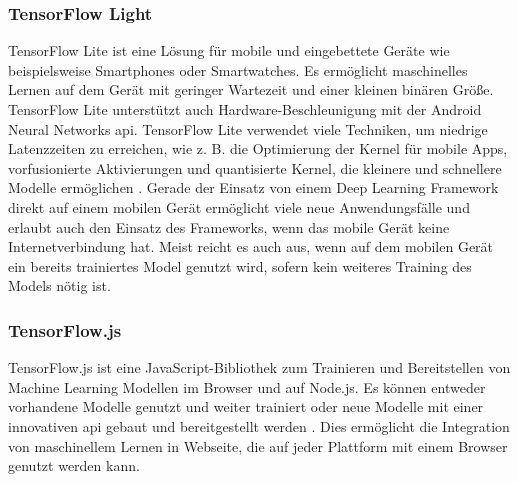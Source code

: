 \subsubsection{TensorFlow Light}
TensorFlow Lite ist eine Lösung für mobile und eingebettete Geräte wie beispielsweise Smartphones oder Smartwatches. Es ermöglicht maschinelles Lernen auf dem Gerät mit geringer Wartezeit und einer kleinen binären Größe. TensorFlow Lite unterstützt auch Hardware-Beschleunigung mit der Android Neural Networks \ac{api}. TensorFlow Lite verwendet viele Techniken, um niedrige Latenzzeiten zu erreichen, wie z. B. die Optimierung der Kernel für mobile Apps, vorfusionierte Aktivierungen und quantisierte Kernel, die kleinere und schnellere Modelle ermöglichen \cite{tensorflow}. Gerade der Einsatz von einem Deep Learning Framework direkt auf einem mobilen Gerät ermöglicht viele neue Anwendungsfälle und erlaubt auch den Einsatz des Frameworks, wenn das mobile Gerät keine Internetverbindung hat. Meist reicht es auch aus, wenn auf dem mobilen Gerät ein bereits trainiertes Model genutzt wird, sofern kein weiteres Training des Models nötig ist. 

\subsubsection{TensorFlow.js}
TensorFlow.js ist eine JavaScript-Bibliothek zum Trainieren und Bereitstellen von Machine Learning Modellen im Browser und auf Node.js. Es können entweder vorhandene Modelle genutzt und weiter trainiert oder neue Modelle mit einer innovativen \ac{api} gebaut und bereitgestellt werden \cite{tensorflowjs}. Dies ermöglicht die Integration von maschinellem Lernen in Webseite, die auf jeder Plattform mit einem Browser genutzt werden kann.

